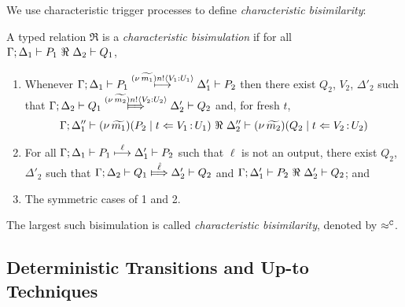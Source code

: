 We use characteristic trigger processes to define \emph{characteristic bisimilarity}: 

\begin{definition}
\label{d:fwb}
	A typed relation $\Re$ is a {\em  characteristic bisimulation} if 
	for all $\horel{\Gamma}{\Delta_1}{P_1}{\ \Re \ }{\Delta_2}{Q_1}$, 
%
	\begin{enumerate}[1)]
		\item 
				Whenever 
				$\Gamma; \Delta_1 \vdash P_1 \stackrel{(\nu\, \widetilde{m_1}) n ! \langle V_1: U_1 \rangle}{\longmapsto} \Delta_1' \vdash P_2$ 
				then there exist 
				$Q_2$, $V_2$, $\Delta'_2$ such that 
				$\horel{\Gamma}{\Delta_2}{Q_1}{\Hby{\news{\widetilde{m_2}}\bactout{n}{V_2: U_2}}}{\Delta_2'}{Q_2}$
				and, for fresh $t$,
%
				\[
					\Gamma; \Delta''_1  \proves  {\newsp{\widetilde{m_1}}{P_2 \Par \ftrigger{t}{V_1}{U_1}}}
	 				\ \Re\ 
					\Delta''_2 \proves {\newsp{\widetilde{m_2}}{Q_2 \Par \ftrigger{t}{V_2}{U_2}}}
				\]

		\item	
				For all $\Gamma; \Delta_1 \vdash P_1 \stackrel{\ell}{\longmapsto} \Delta_1' \vdash P_2$ such that 
				$\ell$ is not an output, there exist $Q_2$, $\Delta'_2$ such that 
				$\horel{\Gamma}{\Delta_2}{Q_1}{\Hby{\hat{\ell}}}{\Delta_2'}{Q_2}$
				and
				$\horel{\Gamma}{\Delta_1'}{P_2}{\ \Re \ }{\Delta_2'}{Q_2}$; and 

		\item	The symmetric cases of 1 and 2.                
	\end{enumerate}
%
	The largest such bisimulation is called \emph{characteristic bisimilarity}, denoted by $\approx^\mathtt{C}$.
\end{definition}


\subsection{Deterministic Transitions and Up-to Techniques}
\label{ss:deter}

